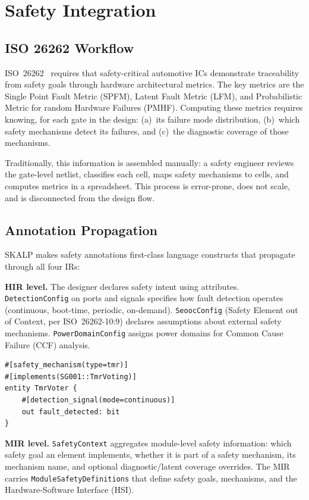 \documentclass[conference]{IEEEtran}
\begin{document}
\section{Safety Integration}
\label{sec:safety}

\subsection{ISO 26262 Workflow}

ISO~26262~\cite{iso26262} requires that safety-critical automotive ICs demonstrate traceability from safety goals through hardware architectural metrics. The key metrics are the Single Point Fault Metric (SPFM), Latent Fault Metric (LFM), and Probabilistic Metric for random Hardware Failures (PMHF). Computing these metrics requires knowing, for each gate in the design: (a)~its failure mode distribution, (b)~which safety mechanisms detect its failures, and (c)~the diagnostic coverage of those mechanisms.

Traditionally, this information is assembled manually: a safety engineer reviews the gate-level netlist, classifies each cell, maps safety mechanisms to cells, and computes metrics in a spreadsheet. This process is error-prone, does not scale, and is disconnected from the design flow.

\subsection{Annotation Propagation}

SKALP makes safety annotations first-class language constructs that propagate through all four IRs:

\textbf{HIR level.} The designer declares safety intent using attributes. \texttt{DetectionConfig} on ports and signals specifies how fault detection operates (continuous, boot-time, periodic, on-demand). \texttt{SeoocConfig} (Safety Element out of Context, per ISO~26262-10:9) declares assumptions about external safety mechanisms. \texttt{PowerDomainConfig} assigns power domains for Common Cause Failure (CCF) analysis.

\begin{lstlisting}
#[safety_mechanism(type=tmr)]
#[implements(SG001::TmrVoting)]
entity TmrVoter {
    #[detection_signal(mode=continuous)]
    out fault_detected: bit
}
\end{lstlisting}

\textbf{MIR level.} \texttt{SafetyContext} aggregates module-level safety information: which safety goal an element implements, whether it is part of a safety mechanism, its mechanism name, and optional diagnostic/latent coverage overrides. The MIR carries \texttt{ModuleSafetyDefinitions} that define safety goals, mechanisms, and the Hardware-Software Interface (HSI).
\end{document}
